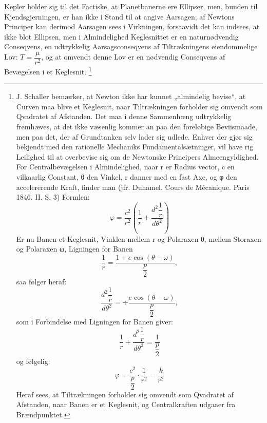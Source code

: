 \documentclass[12pt,a4paper]{book}
\begin{document}
Kepler holder sig til det Factiske, at Planetbanerne ere Ellipser,
men, bunden til Kjendsgjerningen, er han ikke i Stand til at angive
Aarsagen; af Newtons Principer kan derimod Aarsagen sees i
Virkningen, forsaavidt det kan indsees, at ikke blot Ellipsen, men i
Almindelighed Keglesnittet er en naturnødvendig Conseqvens, en
udtrykkelig Aarsagsconseqvens af Tiltrækningens eiendommelige Lov:
$T = \dfrac{\mu}{r^{2}}$, og at omvendt denne Lov
er en nødvendig Conseqvens af Bevægelsen i et Keglesnit.%
\footnote{%
J. Schaller bemærker, at Newton ikke har kunnet „almindelig
bevise“, at Curven maa blive et Keglesnit, naar Tiltrækningen
forholder sig omvendt som Qvadratet af Afstanden. Det maa i denne
Sammenhæng udtrykkelig fremhæves, at det ikke væsenlig kommer an paa
den foreløbige Beviismaade, men paa det, der af Grundtanken selv
lader sig udlede. Enhver der gjør sig bekjendt med den rationelle
Mechaniks Fundamentalsætninger, vil have rig Leilighed til at
overbevise sig om de Newtonske Principers Almeengyldighed. For
Centralbevægelsen i Almindelighed, naar r er Radius vector, c en
vilkaarlig Constant, θ den Vinkel, r danner med en fast Axe, og φ
den accelererende Kraft, finder man (jfr. Duhamel. Cours de
Mécanique. Paris 1846. II. S. 3) Formlen:
\[
\varphi = \frac{c^{2}}{r^{2}} \left( \frac{1}{r} +
    \frac{d^{2}\dfrac{1}{r}}{d \theta^{2}} \right)
\]
Er nu Banen et Keglesnit, Vinklen mellem r og Polaraxen θ, mellem
Storaxen og Polaraxen ω, Ligningen for Banen
\[
\frac{1}{r} = \frac{1 + e \cos (\theta - \omega)}{\dfrac{p}{2}},
\]
saa følger heraf:
\[
\frac{d^{2}\dfrac{1}{r}}{d \theta^{2}} = \div \frac{e \cos (\theta - \omega)}{\dfrac{p}{2}},
\]
som i Forbindelse med Ligningen for Banen giver:
\[
\frac{1}{r} + \frac{d^{2}\dfrac{1}{r}}{d \theta^{2}} = \frac{1}{\dfrac{p}{2}}
\]
og følgelig:
\[
\varphi = \frac{c^{2}}{\dfrac{p}{2}} \cdot \frac{1}{r^{2}} = \frac{k}{r^{2}}
\]
Heraf sees, at Tiltrækningen forholder sig omvendt som Qvadratet af
Afstanden, naar Banen er et Keglesnit, og Centralkraften udgaaer fra
Brændpunktet.}
\end{document}
